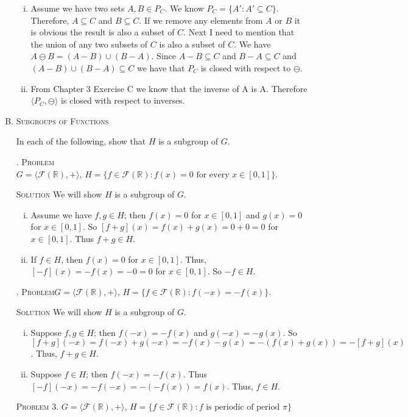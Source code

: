 \documentclass[twoside]{amsart}
\newcommand{\solution}{\textsc{Solution}\xspace}
\newcommand{\problem}{\textsc{Problem}\xspace}
\begin{document}
\begin{enumerate}[A.]
   \begin{enumerate}[(i)]
      \item Assume we have two sets $A,B \in P_C$. We know $P_C = \{ A' : A'
      \subseteq C\}$. Therefore, $A \subseteq C$ and $B \subseteq C$. If we
      remove any elements from $A$ or $B$ it is obvious the result is also a
      subset of $C$. Next I need to mention that the union of any two subsets
      of $C$ is also a subset of $C$.  We have $A \ominus B = (A - B) \cup (B -
      A)$. Since $A-B\subseteq C$ and $B-A\subseteq C$ and $(A-B)\cup (B-A)
      \subseteq C$ we have that $P_C$ is closed with respect to $\ominus$.


      \item From Chapter 3 Exercise C we know that the inverse of A is A. 
      Therefore $\langle P_C, \ominus \rangle$ is closed with respect
      to inverses.
   \end{enumerate}

   \item \textsc{Subgroups of Functions}

   \noindent In each of the following, show that $H$ is a subgroup of $G$.

   . \problem $G = \langle \mathcal{F}(\mathbb{R}), + \rangle,\, H=
   \{ f \in \mathcal{F}(\mathbb{R}) : f(x) = 0 \text{ for every } 
   x \in [0,1]\}$.

   \noindent \solution We will show $H$ is a subgroup of $G$.
   
   \begin{enumerate}[(i)]
      \item Assume we have $f,g \in H$; then $f(x) = 0$ for $x \in [0,1]$ and
      $g(x) = 0$ for $x \in [0,1]$. So $[f+g](x) = f(x) + g(x) = 0 + 0 = 0$ for
      $x \in [0,1]$. Thus $f+g \in H$.

      \item If $f \in H$, then $f(x) = 0$ for $x \in [0,1]$. Thus,
      $[-f](x)=-f(x)=-0=0$ for $x \in [0,1]$. So $-f \in H$.

   \end{enumerate}

   . \problem $G = \langle \mathcal{F}(\mathbb{R}), + \rangle,\, H =
   \{ f \in \mathcal{F}(\mathbb{R}) : f(-x) = -f(x)\}$.

   \noindent \solution We will show $H$ is a subgroup of $G$.

   \begin{enumerate}[(i)]
      \item Suppose $f,g\in H$; then $f(-x) = -f(x)$ and $g(-x) = -g(x)$.
      So $[f+g](-x) = f(-x) + g(-x) = -f(x) - g(x) = -(f(x) + g(x)) = 
      - [f+g](x)$. Thus, $f+g\in H$.

      \item Suppose $f \in H$; then $f(-x)= -f(x)$. Thus 
      $[-f](-x) = -f(-x) = -(-f(x)) = f(x)$. Thus, $f\in H$.
   \end{enumerate}

   \noindent \problem 3. $G=\langle \mathcal{F}(\mathbb{R}),+\rangle,\, H=
   \{ f \in \mathcal{F}(\mathbb{R}) : f \text{ is periodic of period $\pi$}\}$

\end{enumerate}
\end{document}
